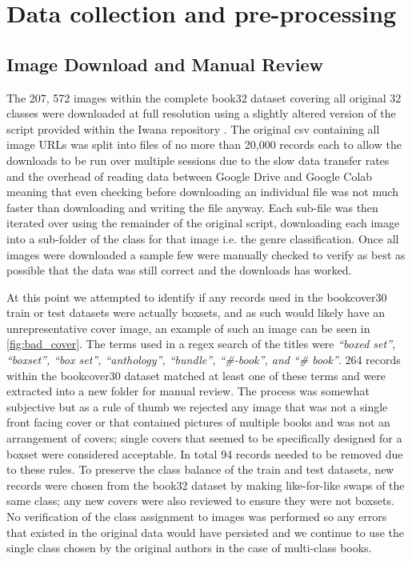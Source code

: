 \documentclass[12pt]{article}
\numberwithin{equation}{section}
\numberwithin{figure}{section}
\begin{document}
\section{Data collection and pre-processing} 
\label{sec:Data_collection_and_pre-processing} 
\subsection{Image Download and Manual Review} 
\label{sub:Image Download and Manual Review} 
The 207, 572 images within the complete book32 dataset covering all original 32 classes were downloaded at full resolution using a slightly altered version of the script provided within the Iwana repository \cite{iwanarepo}. The original csv containing all image URLs was split into files of no more than 20,000 records each to allow the downloads to be run over multiple sessions due to the slow data transfer rates and the overhead of reading data between Google Drive and Google Colab meaning that even checking before downloading an individual file was not much faster than downloading and writing the file anyway. Each sub-file was then iterated over using the remainder of the original script, downloading each image into a sub-folder of the class for that image i.e. the genre classification. Once all images were downloaded a sample few were manually checked to verify as best as possible that the data was still correct and the downloads has worked. 

At this point we attempted to identify if any records used in the bookcover30 train or test datasets were actually boxsets, and as such would likely have an unrepresentative cover image, an example of such an image can be seen in \cref{fig:bad_cover}. The terms used in a regex search of the titles were \emph{``boxed set'', ``boxset'', ``box set'', ``anthology'', ``bundle'', ``\#-book'', and ``\# book''}. 264 records within the bookcover30 dataset matched at least one of these terms and were extracted into a new folder for manual review. The process was somewhat subjective but as a rule of thumb we rejected any image that was not a single front facing cover or that contained pictures of multiple books and was not an arrangement of covers; single covers that seemed to be specifically designed for a boxset were considered acceptable. In total 94 records needed to be removed due to these rules. To preserve the class balance of the train and test datasets, new records were chosen from the book32 dataset by making like-for-like swaps of the same class; any new covers were also reviewed to ensure they were not boxsets. No verification of the class assignment to images was performed so any errors that existed in the original data would have persisted and we continue to use the single class chosen by the original authors in the case of multi-class books.
\end{document}
